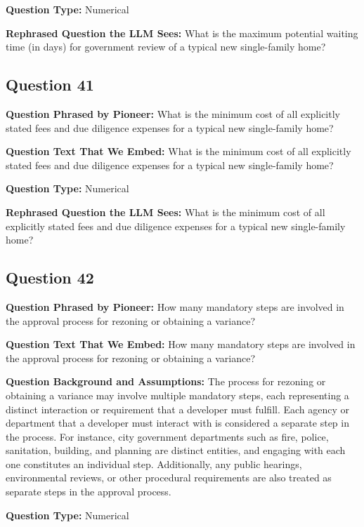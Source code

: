\noindent\textbf{Question Type:} Numerical

\noindent\textbf{Rephrased Question the LLM Sees:} What is the maximum potential waiting time (in days) for government review of a typical new single-family home?

\vspace{1cm}
\subsection*{Question 41}
\noindent\textbf{Question Phrased by Pioneer:} What is the minimum cost of all explicitly stated fees and due diligence expenses for a typical new single-family home?

\noindent\textbf{Question Text That We Embed:} What is the minimum cost of all explicitly stated fees and due diligence expenses for a typical new single-family home?

\noindent\textbf{Question Type:} Numerical

\noindent\textbf{Rephrased Question the LLM Sees:} What is the minimum cost of all explicitly stated fees and due diligence expenses for a typical new single-family home?

\vspace{1cm}
\subsection*{Question 42}
\noindent\textbf{Question Phrased by Pioneer:} How many mandatory steps are involved in the approval process for rezoning or obtaining a variance?

\noindent\textbf{Question Text That We Embed:} How many mandatory steps are involved in the approval process for rezoning or obtaining a variance?

\noindent\textbf{Question Background and Assumptions:} The process for rezoning or obtaining a variance may involve multiple mandatory steps, each representing a distinct interaction or requirement that a developer must fulfill. Each agency or department that a developer must interact with is considered a separate step in the process. For instance, city government departments such as fire, police, sanitation, building, and planning are distinct entities, and engaging with each one constitutes an individual step. Additionally, any public hearings, environmental reviews, or other procedural requirements are also treated as separate steps in the approval process.

\noindent\textbf{Question Type:} Numerical

